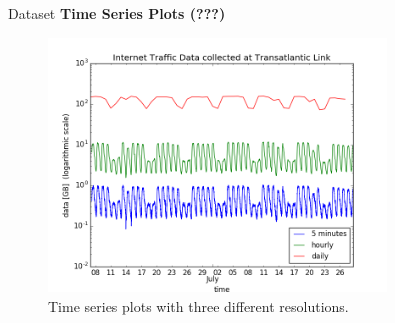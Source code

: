\documentclass{beamer}
\begin{document}
  \begin{frame}{Dataset}
   \textbf{Time Series Plots (???)}
   \begin{figure}
       \includegraphics[width=0.8\textwidth]{images/datasets.png}
       \caption{Time series plots with three different resolutions.}
      \end{figure}
  \end{frame}
  
\end{document}
